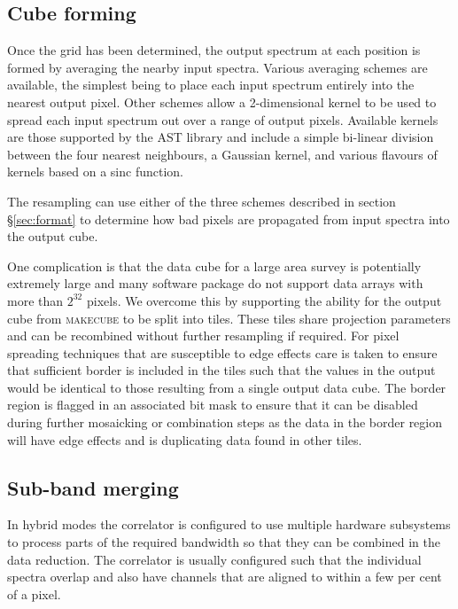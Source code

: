 \documentclass[final,authoryear,5p,times,twocolumn]{elsarticle}
\begin{document}
\subsection{Cube forming}

Once the grid has been determined, the output spectrum at each
position is formed by averaging the nearby input spectra. Various
averaging schemes are available, the simplest being to place each
input spectrum entirely into the nearest output pixel. Other schemes
allow a 2-dimensional kernel to be used to spread each input spectrum
out over a range of output pixels. Available kernels are those
supported by the AST library \citep{SUN211,2012ASPC..461..825B} and
include a simple bi-linear division between the four nearest
neighbours, a Gaussian kernel, and various flavours of kernels based
on a sinc function.

The resampling can use either of the three schemes described in
section \S\ref{sec:format} to determine how bad pixels are propagated
from input spectra into the output cube.

One complication is that the data cube for a large area survey is
potentially extremely large and many software package do not support
data arrays with more than $2^{32}$ pixels. We overcome this by
supporting the ability for the output cube from \textsc{makecube} to
be split into tiles. These tiles share projection parameters and can
be recombined without further resampling if required. For pixel
spreading techniques that are susceptible to edge effects care is
taken to ensure that sufficient border is included in the tiles such
that the values in the output would be identical to those resulting
from a single output data cube. The border region is flagged in an
associated bit mask to ensure that it can be disabled during further
mosaicking or combination steps as the data in the border region will
have edge effects and is duplicating data found in other tiles.

\subsection{Sub-band merging}

In hybrid modes the correlator is configured to use multiple
hardware subsystems to process parts of the required bandwidth so
that they can be combined in the data reduction. The correlator is
usually configured such that the individual spectra overlap and also
have channels that are aligned to within a few per cent of a pixel.
\end{document}
